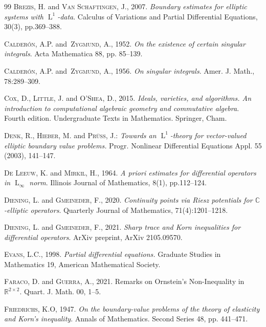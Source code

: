 \documentclass[a4paper,10pt]{amsart}
\newcommand{\R}{\mathbb R}
\newcommand{\lebe}{\operatorname{L}}
\numberwithin{equation}{section}
\theoremstyle{remark}
\numberwithin{equation}{section}
\begin{document}
\begin{thebibliography}{99}
		 \textsc{Brezis, H.} and \textsc{Van Schaftingen, J.}, 2007. \emph{Boundary estimates for elliptic systems with $\lebe^1$-data}. Calculus of Variations and Partial Differential Equations, 30(3), pp.369--388.
		
		 \textsc{Calder\'{o}n, A.P.}  and~\textsc{Zygmund, A.}, 1952. \emph{On the existence of certain singular integrals}. Acta Mathematica 88,  pp. 85--139.
		
		 \textsc{Calder\'{o}n, A.P.} and~\textsc{Zygmund, A.}, 1956. \emph{On singular integrals}. Amer. J. Math., 78:289--309.
		
		 \textsc{Cox, D.}, \textsc{Little, J.} and \textsc{O'Shea, D.}, 2015. \emph{Ideals, varieties, and algorithms. An introduction to computational algebraic geometry and commutative algebra}. Fourth edition. Undergraduate Texts in Mathematics. Springer, Cham.
		
		 \textsc{Denk, R., Hieber, M.} and \textsc{Pr\"{u}ss, J.}: \emph{Towards an $\lebe^{1}$-theory for vector-valued elliptic boundary value problems.} Progr. Nonlinear Differential Equations Appl. 55 (2003), 141--147.
		
		 \textsc{De Leeuw, K.} and \textsc{Mirkil, H.}, 1964. \emph{A priori estimates for differential operators in $\lebe_ {\infty}$ norm}. Illinois Journal of Mathematics, 8(1), pp.112--124.
		
		 \textsc{Diening, L.} and \textsc{Gmeineder, F.}, 2020. \emph{Continuity points via Riesz potentials for $\mathbb{C}$-elliptic operators}. Quarterly Journal of Mathematics, 71(4):1201--1218. 
		
		 \textsc{Diening, L.} and \textsc{Gmeineder, F.}, 2021. \emph{Sharp trace and Korn inequalities for differential operators}. ArXiv preprint, ArXiv 2105.09570. 
		
		 \textsc{Evans, L.C.}, 1998. \emph{Partial differential equations.} Graduate Studies in Mathematics 19, American Mathematical Society. 
		
		 \textsc{Faraco, D.} and \textsc{Guerra, A.}, 2021.  Remarks on Ornstein's Non-Inequality in $\R^{2\times 2}$. Quart. J. Math. 00,
		1--5.
		
		 \textsc{Friedrichs, K.O}, 1947.  \emph{On the boundary-value problems of the theory of elasticity and Korn's inequality}. Annals of Mathematics. Second Series 48, pp. 441--471.
		

\end{thebibliography}
\end{document}
